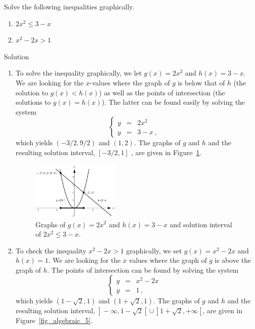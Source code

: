 \ifvc
\begin{example}
 Solve the following inequalities graphically.

\begin{multicols}{2}
\begin{enumerate}

\item  $2x^2 \leq 3-x$

\item  $x^2 - 2x > 1$

\end{enumerate}
\end{multicols}
Solution 

 
\begin{enumerate}

\item  To solve the inequality graphically, we let $g(x) = 2x^2$ and $h(x)=3-x$.  We are looking for the $x$-values where the graph of $g$ is below that of $h$ (the solution to $g(x) < h(x)$) as well as the points of intersection (the solutions to $g(x)=h(x)$). The latter can be found easily by solving the system
$$
\left\{\begin{array}{rcl}
y & = & 2x^2\\[.1cm]
y & = & 3-x\,,
\end{array}\right.
$$
which yields $(-3/2, 9/2)$ and $(1,2)$. The graphs of $g$ and $h$ and the resulting solution interval, $\left[-3/2,1\right]$ , are given in Figure~\ref{fig_algebraic_4}. 
\begin{figure}[H]
    \begin{center}
			\includegraphics[width=0.4\textwidth]{fig_algebraic_4}
	\caption{Graphs of $g(x) = 2x^2$ and $h(x)=3-x$ and solution interval of $2x^2 \leq 3-x$.}
	\label{fig_algebraic_4}
	\end{center}
\end{figure}

	
\item  To check the inequality $x^2 - 2x > 1$ graphically, we set $g(x) = x^2-2x$ and $h(x)=1$.  We are looking for the $x$ values where the graph of $g$ is above the graph of $h$. The points of intersection can be found by solving the system
$$
\left\{
\begin{array}{rcl}
y & = & x^2-2x\\[.1cm]
y & = & 1\,,
\end{array}\right.
$$
which yields $(1-\sqrt{2}, 1)$ and $(1+\sqrt{2},1)$.  The graphs of $g$ and $h$ and the resulting solution interval, $\left.\right]-\infty,1-\sqrt{2}\left[\right. \cup \left.\right]1+\sqrt{2},+\infty\left[\right.$, are given in Figure~\ref{fig_algebraic_5}.


\end{enumerate}
\end{example}

